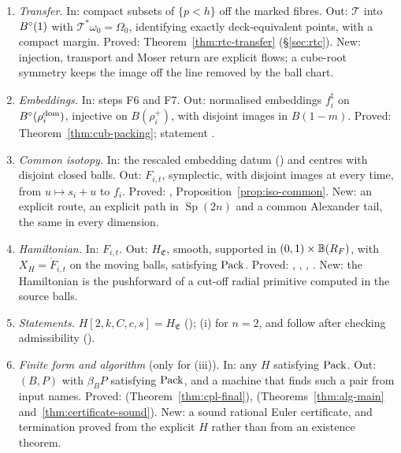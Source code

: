 \begin{enumerate}[label=\textbf{F\arabic*},leftmargin=*,itemsep=3pt]
 deck equivalent. Proved: \S\ref{sec:shd-four} (Propositions~\ref{prop:shd4-second}, \ref{prop:shd4-third},
 \ref{prop:shd4-moser} and~\ref{prop:shd4-maps}) with the strip map, Proposition~\ref{prop:hdl-strip}; outline in
 . New: the three Moser paths have explicit primitives that vanish on the marked fibres and are
 invariant under the deck maps.
\item \emph{Transfer.} In: compact subsets of $\{p<h\}$ off the marked fibres. Out: $\mathcal T$ into $B^{\circ}(1)$
 with $\mathcal T^*\omega_0=\Omega_0$, identifying exactly deck-equivalent points, with a compact margin.
 Proved: Theorem~\ref{thm:rtc-transfer} (\S\ref{sec:rtc}). New: injection, transport and Moser return are explicit
 flows; a cube-root symmetry keeps the image off the line removed by the ball chart.
\item \emph{Embeddings.} In: steps F6 and F7. Out: normalised embeddings $f^\natural_i$ on $B^{\circ}(\rho_i^{\rm dom})$,
 injective on $B(\rho_i^+)$, with disjoint images in $B(1-m)$. Proved: Theorem~\ref{thm:cub-packing}; statement
 .
\item \emph{Common isotopy.} In: the rescaled embedding datum () and centres with
 disjoint closed balls. Out: $F_{i,t}$, symplectic, with disjoint images at every time, from $u\mapsto s_i+u$ to $f_i$.
 Proved: , Proposition~\ref{prop:iso-common}. New: an explicit route, an explicit path
 in $\operatorname{Sp}(2n)$ and a common Alexander tail, the same in every dimension.
\item \emph{Hamiltonian.} In: $F_{i,t}$. Out: $H_{\mathfrak E}$, smooth, supported in $(0,1)\times\mathbb{B}(R_F)$, with
 $X_H=\dot F_{i,t}$ on the moving balls, satisfying $\mathrm{Pack}$. Proved: ,
 , , . New: the Hamiltonian is the
 pushforward of a cut-off radial primitive computed in the source balls.
\item \emph{Statements.} $H[2,k,C,c,s]=H_{\mathfrak E}$ (); (i)
 for $n=2$,  and  follow after checking admissibility
 ().
\item \emph{Finite form and algorithm} (only for (iii)). In: any $H$ satisfying $\mathrm{Pack}$. Out:
 $(B,P)$ with $\beta_BP$ satisfying $\mathrm{Pack}$, and a machine that finds such a pair from input names. Proved:
  (Theorem~\ref{thm:cpl-final}),  (Theorems~\ref{thm:alg-main}
 and~\ref{thm:certificate-sound}). New: a sound rational Euler certificate, and termination proved from the explicit
 $H$ rather than from an existence theorem.
\end{enumerate}

